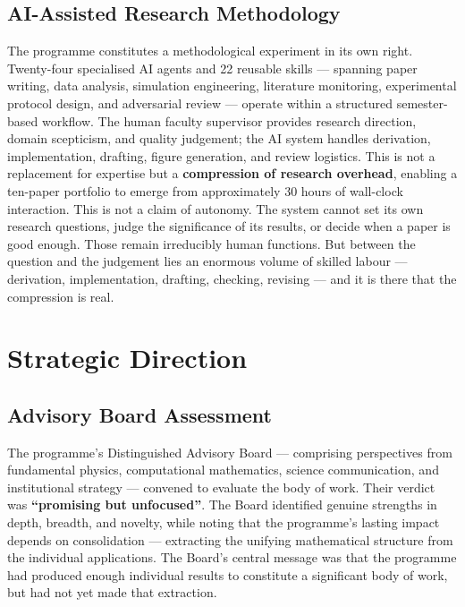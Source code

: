 \documentclass[11pt,a4paper]{article}
\begin{document}
\subsection{AI-Assisted Research Methodology}

The programme constitutes a methodological experiment in its own right. Twenty-four specialised AI agents and 22 reusable skills --- spanning paper writing, data analysis, simulation engineering, literature monitoring, experimental protocol design, and adversarial review --- operate within a structured semester-based workflow. The human faculty supervisor provides research direction, domain scepticism, and quality judgement; the AI system handles derivation, implementation, drafting, figure generation, and review logistics. This is not a replacement for expertise but a \textbf{compression of research overhead}, enabling a ten-paper portfolio to emerge from approximately 30 hours of wall-clock interaction. This is not a claim of autonomy. The system cannot set its own research questions, judge the significance of its results, or decide when a paper is good enough. Those remain irreducibly human functions. But between the question and the judgement lies an enormous volume of skilled labour --- derivation, implementation, drafting, checking, revising --- and it is there that the compression is real.

\section{Strategic Direction}\label{sec:strategic}

\subsection{Advisory Board Assessment}

The programme's Distinguished Advisory Board --- comprising perspectives from fundamental physics, computational mathematics, science communication, and institutional strategy --- convened to evaluate the body of work. Their verdict was \textbf{``promising but unfocused''}. The Board identified genuine strengths in depth, breadth, and novelty, while noting that the programme's lasting impact depends on consolidation --- extracting the unifying mathematical structure from the individual applications. The Board's central message was that the programme had produced enough individual results to constitute a significant body of work, but had not yet made that extraction.
\end{document}
